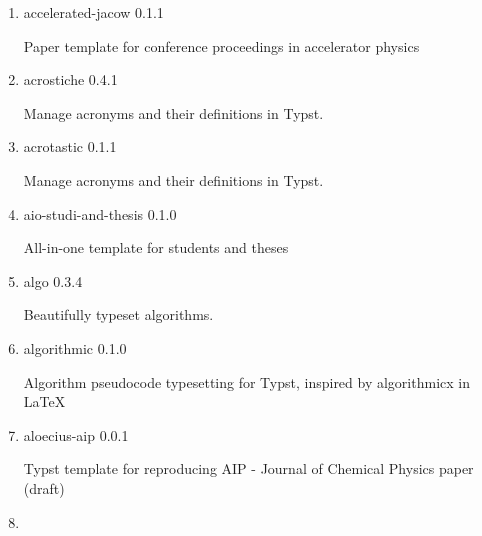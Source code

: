 \begin{enumerate}

  { academic-conf-pre } { 0.1.0 }

  Slide Theme for Acadmic Presentations in Australia
\item
  \href{/universe/package/accelerated-jacow/}{}


  { accelerated-jacow } { 0.1.1 }

  Paper template for conference proceedings in accelerator physics
\item
  \href{/universe/package/acrostiche/}{}

  { acrostiche } { 0.4.1 }

  Manage acronyms and their definitions in Typst.
\item
  \href{/universe/package/acrotastic/}{}

  { acrotastic } { 0.1.1 }

  Manage acronyms and their definitions in Typst.
\item
  \href{/universe/package/aio-studi-and-thesis/}{}


  { aio-studi-and-thesis } { 0.1.0 }

  All-in-one template for students and theses
\item
  \href{/universe/package/algo/}{}

  { algo } { 0.3.4 }

  Beautifully typeset algorithms.
\item
  \href{/universe/package/algorithmic/}{}

  { algorithmic } { 0.1.0 }

  Algorithm pseudocode typesetting for Typst, inspired by algorithmicx
  in LaTeX
\item
  \href{/universe/package/aloecius-aip/}{}


  { aloecius-aip } { 0.0.1 }

  Typst template for reproducing AIP - Journal of Chemical Physics paper
  (draft)
\item
  \href{/universe/package/anatomy/}{}


\end{enumerate}
